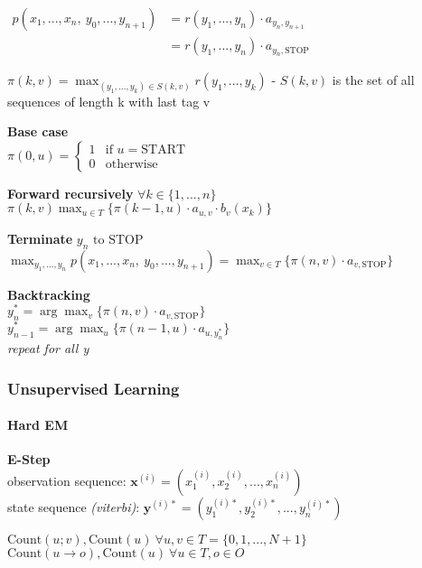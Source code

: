 \documentclass[11pt]{article}
\begin{document}
\(\begin{aligned}p(x_1,...,x_n,\ y_0,...,y_{n+1})&=r(y_1,...,y_n)\cdot a_{y_{n},y_{n+1}}\\&= r(y_1,...,y_n)\cdot a_{y_{n},\text{STOP}}\end{aligned}\)

\(\pi(k,v)=\max_{(y_1,...,y_k)\in S(k,v)}r(y_1,...,y_k)\) - \(S(k,v)\)
is the set of all sequences of length k with last tag v

\textbf{Base case}\\
\(\pi(0,u)=\left\{\begin{array}{cl}1 & \text{if }u=\text{START}\\0 & \text{otherwise}\end{array}\right.\)

\textbf{Forward recursively} \(\forall k\in\{1,...,n\}\)\\
\(\pi(k,v)\max_{u\in T}\{\pi(k-1,u)\cdot a_{u,v}\cdot b_v(x_k)\}\)

\textbf{Terminate} \(y_n\text{ to STOP}\)\\
\(\max_{y_1,...,y_n}p(x_1,...,x_n,\ y_0,...,y_{n+1})=\max_{v\in T}\{\pi(n,v)\cdot a_{v,\text{STOP}}\}\)

\textbf{Backtracking}\\
\(y_n^*=\arg\max_v\{\pi(n,v)\cdot a_{v,\text{STOP}}\}\)\\
\(y_{n-1}^*=\arg\max_u\{\pi(n-1,u)\cdot a_{u,y_n^*}\}\)\\
\emph{repeat for all y}

    \hypertarget{unsupervised-learning}{%
\subsubsection{Unsupervised Learning}\label{unsupervised-learning}}

\hypertarget{hard-em}{%
\paragraph{Hard EM}\label{hard-em}}

\textbf{E-Step}\\
observation sequence:
\(\boldsymbol x^{(i)}= (x_1^{(i)},x_2^{(i)},...,x_n^{(i)})\)\\
state sequence \emph{(viterbi)}:
\(\boldsymbol y^{(i)*}= (y_1^{(i)*},y_2^{(i)*},...,y_n^{(i)*})\)

\(\text{Count}(u;v), \text{Count}(u)\ \forall u,v\in T=\{0,1,...,N+1\}\)\\
\(\text{Count}(u\rightarrow o), \text{Count}(u)\ \forall u\in T,o\in O\)
\end{document}
